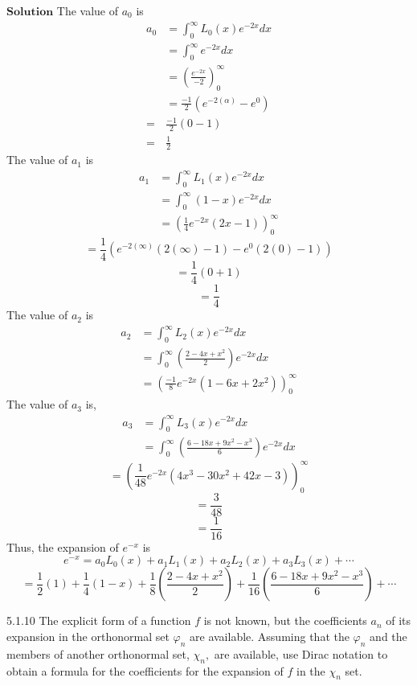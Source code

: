 \documentclass{article}
\begin{document}
\begin{flushleft}
$\boxed{\textbf{Solution}}$ The value of $a_0$ is
$$
\begin{aligned}
a_{0} &=\int_{0}^{\infty} L_{0}(x) e^{-2 x} d x \\
&=\int_{0}^{\infty} e^{-2 x} d x \\
&=\left(\frac{e^{-2 x}}{-2}\right)_{0}^{\infty} \\
&=\frac{-1}{2}\left(e^{-2(\alpha)}-e^{0}\right) \\
=& \frac{-1}{2}(0-1) \\
=& \frac{1}{2}
\end{aligned}
$$
The value of $a_1$ is
$$
\begin{aligned}
a_{1} &=\int_{0}^{\infty} L_{1}(x) e^{-2 x} d x \\
&=\int_{0}^{\infty}(1-x) e^{-2 x} d x \\
&=\left(\frac{1}{4} e^{-2 x}(2 x-1)\right)_{0}^{\infty}
\end{aligned}
$$
$$
=\frac{1}{4}\left(e^{-2(\infty)}(2(\infty)-1)-e^{0}(2(0)-1)\right)
$$
$$=\frac{1}{4}(0+1)$$
$$=\frac{1}{4}$$
The value of $a_2$ is
$$
\begin{aligned}
a_{2} &=\int_{0}^{\infty} L_{2}(x) e^{-2 x} d x \\
&=\int_{0}^{\infty}\left(\frac{2-4 x+x^{2}}{2}\right) e^{-2 x} d x \\
&=\left(\frac{-1}{8} e^{-2 x}\left(1-6 x+2 x^{2}\right)\right)_{0}^{\infty}
\end{aligned}
$$
The value of $a_{3}$ is,
$$
\begin{aligned}
a_{3} &=\int_{0}^{\infty} L_{3}(x) e^{-2 x} d x \\
&=\int_{0}^{\infty}\left(\frac{6-18 x+9 x^{2}-x^{3}}{6}\right) e^{-2 x} d x
\end{aligned}
$$
$$
=\left(\frac{1}{48} e^{-2 x}\left(4 x^{3}-30 x^{2}+42 x-3\right)\right)_{0}^{\infty}
$$
$$=\frac{3}{48}$$
$$=\frac{1}{16}$$
Thus, the expansion of $e^{-x}$ is
$$
e^{-x}=a_{0} L_{0}(x)+a_{1} L_{1}(x)+a_{2} L_{2}(x)+a_{3} L_{3}(x)+\cdots
$$
$$
=\frac{1}{2}(1)+\frac{1}{4}(1-x)+\frac{1}{8}\left(\frac{2-4 x+x^{2}}{2}\right)+\frac{1}{16}\left(\frac{6-18 x+9 x^{2}-x^{3}}{6}\right)+\cdots
$$

\newpage

\begin{mybox}{5.1.10}
The explicit form of a function $f$ is not known, but the coefficients $a_{n}$ of its expansion in the orthonormal set $\varphi_{n}$ are available. Assuming that the $\varphi_{n}$ and the members of another orthonormal set, $\chi_{n},$ are available, use Dirac notation to obtain a formula for the coefficients for the expansion of $f$ in the $\chi_{n}$ set.
\end{mybox}


\end{flushleft}
\end{document}
